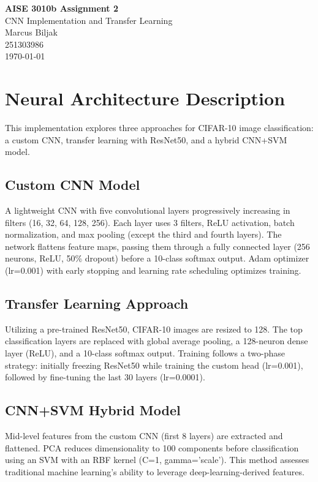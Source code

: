 \documentclass[12pt]{article}
\begin{document}
\begin{center}
    \Large\textbf{AISE 3010b Assignment 2} \\[0.5cm]
    \large CNN Implementation and Transfer Learning \\[1cm]
    
    \normalsize
    Marcus Biljak \\
    251303986 \\
    \today
\end{center}


\section{Neural Architecture Description}
This implementation explores three approaches for CIFAR-10 image classification: a custom CNN, transfer learning with ResNet50, and a hybrid CNN+SVM model.

\subsection{Custom CNN Model}
A lightweight CNN with five convolutional layers progressively increasing in filters (16, 32, 64, 128, 256). Each layer uses 3 filters, ReLU activation, batch normalization, and max pooling (except the third and fourth layers). The network flattens feature maps, passing them through a fully connected layer (256 neurons, ReLU, 50\% dropout) before a 10-class softmax output. Adam optimizer (lr=0.001) with early stopping and learning rate scheduling optimizes training.

\subsection{Transfer Learning Approach}
Utilizing a pre-trained ResNet50, CIFAR-10 images are resized to 128. The top classification layers are replaced with global average pooling, a 128-neuron dense layer (ReLU), and a 10-class softmax output. Training follows a two-phase strategy: initially freezing ResNet50 while training the custom head (lr=0.001), followed by fine-tuning the last 30 layers (lr=0.0001).

\subsection{CNN+SVM Hybrid Model}
Mid-level features from the custom CNN (first 8 layers) are extracted and flattened. PCA reduces dimensionality to 100 components before classification using an SVM with an RBF kernel (C=1, gamma='scale'). This method assesses traditional machine learning’s ability to leverage deep-learning-derived features.
\end{document}
